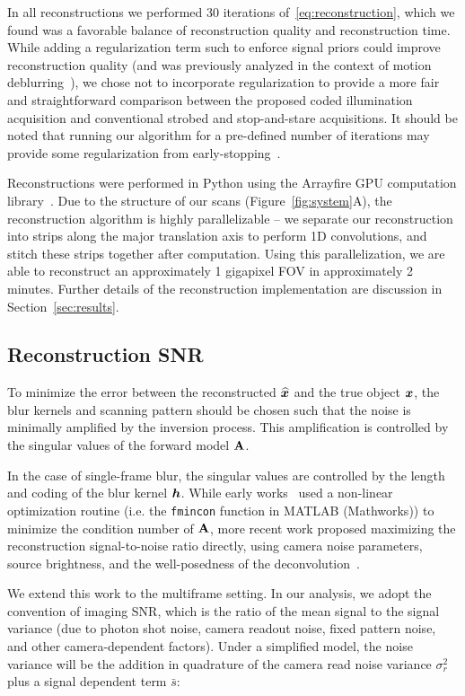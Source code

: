 In all reconstructions we performed 30 iterations of~\eqref{eq:reconstruction}, which we found was a favorable balance of reconstruction quality and reconstruction time. While adding a regularization term such to enforce signal priors could improve reconstruction quality (and was previously analyzed in the context of motion deblurring~\cite{mitra:2014}), we chose not to incorporate regularization to provide a more fair and straightforward comparison between the proposed coded illumination acquisition and conventional strobed and stop-and-stare acquisitions. It should be noted that running our algorithm for a pre-defined number of iterations may provide some regularization from early-stopping~\cite{hagiwara2000regularization}.

Reconstructions were performed in Python using the Arrayfire GPU computation library~\cite{Yalamanchili2015}. 
Due to the structure of our scans (Figure~\ref{fig:system}A), the reconstruction algorithm is highly parallelizable -- we separate our reconstruction into strips along the major translation axis to perform 1D convolutions, and stitch these strips together after computation. 
Using this parallelization, we are able to reconstruct an approximately 1 gigapixel FOV in approximately 2 minutes. Further details of the reconstruction implementation are discussion in Section~\ref{sec:results}.

\subsection{Reconstruction SNR}\label{sec:methods_snr}

To minimize the error between the reconstructed $\widehat {\bm{x}}$ and the true object $\bm{x}$, the blur kernels and scanning pattern should be chosen such that the noise is minimally amplified by the inversion process. This amplification is controlled by the singular values of the forward model $\mathbf{A}$. 

In the case of single-frame blur, the singular values are controlled by the length and coding of the blur kernel $\bm{h}$. 
While early works~\cite{raskar2006coded, Ma:15} used a non-linear optimization routine (i.e. the \texttt{fmincon} function in MATLAB (Mathworks)) to minimize the condition number of $\mathbf{A}$, more recent work proposed maximizing the reconstruction signal-to-noise ratio directly, using camera noise parameters, source brightness, and the well-posedness of the deconvolution~\cite{agrawal2009optimal, cossairt2013does}. 

We extend this work to the multiframe setting.
In our analysis, we adopt the convention of imaging SNR, which is the ratio of the mean signal to the signal variance (due to photon shot noise, camera readout noise, fixed pattern noise, and other camera-dependent factors). Under a simplified model, the noise variance will be the addition in quadrature of the camera read noise variance $\sigma^2_{r}$ plus a signal dependent term $\bar{s}$:

